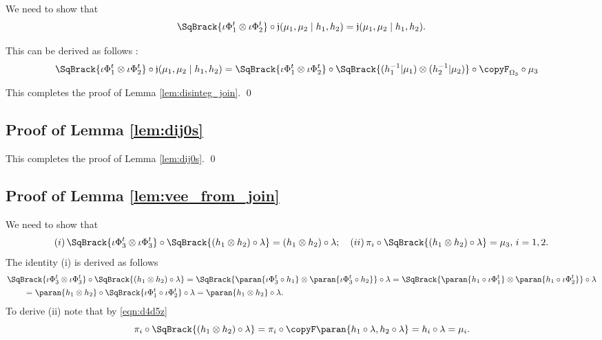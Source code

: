 \documentclass[12pt,oneside,pb-diagram]{article}
\newcommand{\join}{\mathfrak{j}}
\begin{document}
We need to show that
%
\[\SqBrack{\iota \Phi_1^t \otimes \iota \Phi_2^t} \circ \join(\mu_1, \mu_2 \mid h_1, h_2) = \join(\mu_1, \mu_2 \mid h_1, h_2) .\]
%


This can be derived as follows :
%
\[\begin{split}
	& \SqBrack{\iota \Phi_1^t \otimes \iota \Phi_2^t} \circ \join(\mu_1, \mu_2 \mid h_1, h_2) = \SqBrack{\iota \Phi_1^t \otimes \iota \Phi_2^t} \circ \SqBrack{ (h_1^{-1}|\mu_1) \otimes (h_2^{-1}|\mu_2) } \circ \copyF_{\Omega_3} \circ \mu_3
\end{split}\]
%

This completes the proof of Lemma \ref{lem:disinteg_join}. \qed

\subsection{Proof of Lemma \ref{lem:dij0s}} \label{sec:proof:dij0s}

This completes the proof of Lemma \ref{lem:dij0s}. \qed
\subsection{Proof of Lemma \ref{lem:vee_from_join}} \label{sec:proof:vee_from_join}

We need to show that 
%
\[ (i)\, \SqBrack{ \iota \Phi_3^t \otimes \iota \Phi_3^t } \circ \SqBrack{ (h_1 \otimes h_2) \circ \lambda} = (h_1 \otimes h_2) \circ \lambda; \quad (ii)\,  \pi_i \circ \SqBrack{ (h_1 \otimes h_2) \circ \lambda} = \mu_3, \, i=1,2. \]
%
The identity (i) is derived as follows
%
\[\begin{split}
	&\SqBrack{ \iota \Phi_3^t \otimes \iota \Phi_3^t } \circ \SqBrack{ (h_1 \otimes h_2) \circ \lambda} = \SqBrack{ \paran{\iota \Phi_3^t \circ h_1} \otimes \paran{\iota \Phi_3^t \circ h_2} } \circ \lambda = \SqBrack{ \paran{h_1 \circ \iota \Phi_1^t} \otimes \paran{h_1 \circ \iota \Phi_2^t} } \circ \lambda \\
	&\quad \quad = \paran{h_1 \otimes h_2} \circ \SqBrack{\iota \Phi_1^t \circ \iota \Phi_2^t} \circ \lambda = \paran{h_1 \otimes h_2} \circ \lambda.
\end{split}\]
%
To derive (ii) note that by \eqref{eqn:d4d5z}
%
\[ \pi_i \circ \SqBrack{ (h_1 \otimes h_2) \circ \lambda} = \pi_i \circ \copyF \paran{ h_1 \circ \lambda, h_2 \circ \lambda } = h_i \circ \lambda = \mu_i. \]
%
\end{document}
